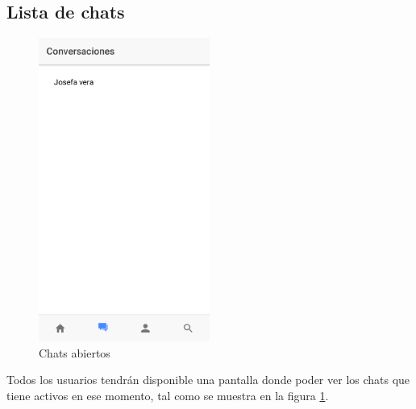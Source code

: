 \subsection{Lista de chats}
\begin{figure}[!h]
    \centering
    \includegraphics[width=0.5\textwidth]{images/screenshots/Doctor-vista-chats-abiertos.png}
    \caption{Chats abiertos}
    \label{vista-chats-abiertos}
\end{figure}

Todos los usuarios tendrán disponible una pantalla donde poder ver los chats
que tiene activos en ese momento, tal como se muestra en la figura \ref{vista-chats-abiertos}.
\clearpage

